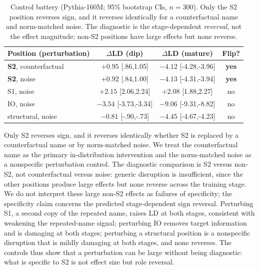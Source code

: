 \documentclass[11pt]{article}
\begin{document}
\begin{table}[t]
  \centering
  \small
  \setlength{\tabcolsep}{10pt}
  \begin{tabular}{lccc}
    \toprule
    Position (perturbation) & $\Delta$LD (dip) & $\Delta$LD (mature) & Flip? \\
    \midrule
    \textbf{S2}, counterfactual & $\mathbf{+0.95}$ [.86,1.05] & $\mathbf{-4.12}$ [-4.28,-3.96] & \textbf{yes} \\
    \textbf{S2}, noise          & $\mathbf{+0.92}$ [.84,1.00] & $\mathbf{-4.13}$ [-4.31,-3.94] & \textbf{yes} \\
    S1, noise                   & $+2.15$ [2.06,2.24] & $+2.08$ [1.88,2.27] & no \\
    IO, noise                   & $-3.54$ [-3.73,-3.34] & $-9.06$ [-9.31,-8.82] & no \\
    structural, noise           & $-0.81$ [-.90,-.73] & $-4.45$ [-4.67,-4.23] & no \\
    \bottomrule
  \end{tabular}
  \caption{Control battery (Pythia-160M; 95\% bootstrap CIs, $n{=}300$). Only the
  S2 position reverses sign, and it reverses identically for a counterfactual
  name and norm-matched noise. The diagnostic is the stage-dependent
  \emph{reversal}, not the effect magnitude: non-S2 positions have large effects
  but none reverse.}
  \label{tab:control_battery}
\end{table}
Only S2 reverses sign, and it reverses identically whether S2 is replaced by a
counterfactual name or by norm-matched noise. We treat the counterfactual name
as the primary in-distribution intervention and the norm-matched noise as a
nonspecific perturbation control. The diagnostic comparison is S2 versus
non-S2, not counterfactual versus noise: generic disruption is insufficient,
since the other positions produce large effects but none reverse across the
training stage. We do not interpret these large non-S2 effects as failures of
specificity; the specificity claim concerns the predicted stage-dependent sign
reversal. Perturbing S1, a second copy of the repeated name, raises LD at both
stages, consistent with weakening the repeated-name signal; perturbing IO
removes target information and is damaging at both stages; perturbing a
structural position is a nonspecific disruption that is mildly damaging at both
stages, and none reverses. The controls thus show that a perturbation can be
large without being diagnostic: what is specific to S2 is not effect size but
role reversal.
\end{document}
